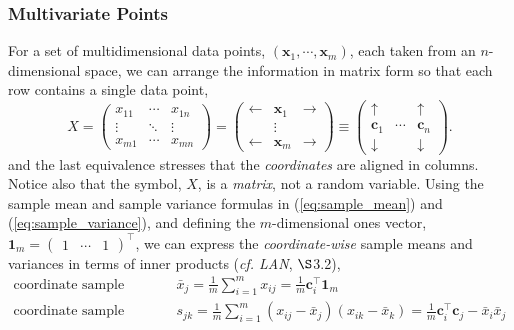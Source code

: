 \documentclass[12pt, twoside, draft]{article}
\begin{document}
\subsubsection{Multivariate Points}\label{sec:sample_mean_variance_multivariate}
For a set of multidimensional data points, $(\mathbf{x}_1, \cdots, \mathbf{x}_m)$, each taken from an $n$-dimensional space, we can arrange the information in matrix form so that each row contains a single data point,
\begin{equation}
X = \begin{pmatrix} x_{11} & \cdots & x_{1n} \\ \vdots & \ddots & \vdots \\ x_{m1} & \cdots & x_{mn} \end{pmatrix} = 
\begin{pmatrix} \leftarrow &\mathbf{x}_1 & \rightarrow \\  & \vdots &  \\ \leftarrow & \mathbf{x}_m & \rightarrow \end{pmatrix} \equiv 
\begin{pmatrix} \uparrow & & \uparrow \\ \mathbf{c}_1 & \cdots & \mathbf{c}_n \\ \downarrow & & \downarrow \end{pmatrix}.
\end{equation}
and the last equivalence stresses that the \textit{coordinates} are aligned in columns.  Notice also that the symbol, $X$, is a \textit{matrix}, not a random variable.  Using the sample mean and sample variance formulas in (\ref{eq:sample_mean}) and (\ref{eq:sample_variance}), and defining the $m$-dimensional ones vector, $\mathbf{1}_m = \begin{pmatrix} 1 & \cdots & 1 \end{pmatrix}^\top$, we can express the \textit{coordinate-wise} sample means and variances in terms of inner products (\textit{cf. LAN}, $\S$3.2),
\begin{align}
\text{coordinate sample mean:} \hspace{10pt} &\bar{x}_j = \frac{1}{m} \sum_{i=1}^m x_{ij} = \frac{1}{m} \mathbf{c}_i^\top \mathbf{1}_m \\
\text{coordinate sample covariance:} \hspace{10pt} & s_{jk} = \frac{1}{m} \sum_{i=1}^m (x_{ij} - \bar{x}_j)(x_{ik} - \bar{x}_k) = \frac{1}{m} \mathbf{c}_i^\top \mathbf{c}_j - \bar{x}_i \bar{x}_j
\end{align}
\end{document}
